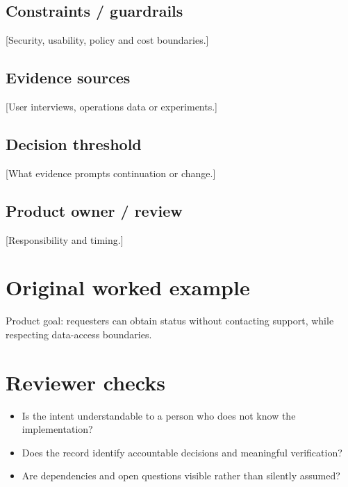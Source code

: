 \documentclass[11pt,letterpaper]{article}
\begin{document}
\subsection{Constraints / guardrails}
[Security, usability, policy and cost boundaries.]

\subsection{Evidence sources}
[User interviews, operations data or experiments.]

\subsection{Decision threshold}
[What evidence prompts continuation or change.]

\subsection{Product owner / review}
[Responsibility and timing.]

\section{Original worked example}
\begin{tcolorbox}[colback=tealback,colframe=navy,title={Illustrative entry},breakable]
Product goal: requesters can obtain status without contacting support, while respecting data-access boundaries.

\end{tcolorbox}
\section{Reviewer checks}
\begin{itemize}[leftmargin=*,itemsep=2pt]
\item Is the intent understandable to a person who does not know the implementation?
\item Does the record identify accountable decisions and meaningful verification?
\item Are dependencies and open questions visible rather than silently assumed?
\end{itemize}
\end{document}
